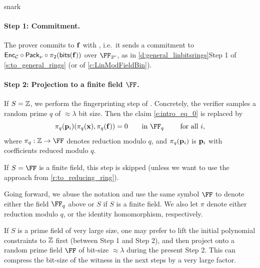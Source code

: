 \begin{lncsappendix}{snark}




     \paragraph{Step 1: Commitment.} The prover commits to $\mathbf{f}$ with \ftwoz, i.e.\ it sends a commitment to $\mathsf{Enc}_{\mathcal{C}}\circ\mathsf{Pack}_\nu\circ\pi_2(\mathsf{bits}(\mathbf{f}))$ over $\comfield$, as in \iflncs\cref{d:general_linbitsrings}\else Step 1 of \cref{s:to_general_rings} (or of \cref{c:LinModFieldBin})\fi. 

     \paragraph{Step 2: Projection to a   finite field $\FF$.}  If $S=\mathbb{Z}$, we perform the fingerprinting step of \cite{zaratan}. Concretely, the verifier samples a random prime $q$  of $\approx \lambda$ bit size. Then the claim \eqref{e:intro_eq_0} is replaced by
\begin{equation}\label{e:intro_eq_05}\pi_q(\pp_i)(\pi_q(\xx),\pi_q(\bff))=0 \qquad \text{in  } \FF_q \qquad \text{ for all } i,\end{equation} 
where $\pi_q:\ZZ\to \FF$ denotes reduction modulo $q$, and $\pi_q(\mathbf{p}_i)$ is $\mathbf{p}_i$ with coefficients reduced modulo $q$. 

If $S=\FF$ is a finite field, this step is skipped (unless we want to use the approach from \cref{r:to_reducing_ring}). 

Going forward,  we abuse the notation and use the same symbol $\FF$ to denote either the field $\FF_q$ above or $S$ if $S$ is a finite field. We also let $\pi$ denote either reduction modulo $q$, or the identity homomorphism, respectively. 



\renewcommand{\lift}{\mathsf{lift}}

\begin{remark}\label{r:to_reducing_ring} If $S$ is a prime field of very large size, one may prefer to lift the initial polynomial constraints to $\mathbb{Z}$  first (between Step 1 and Step 2), and then project onto a random prime field $\FF$ of bit-size $\approx \lambda$ during the present Step 2. This can compress the bit-size of the witness in the next steps by a very large factor. 
    

\end{remark}
\end{lncsappendix}
